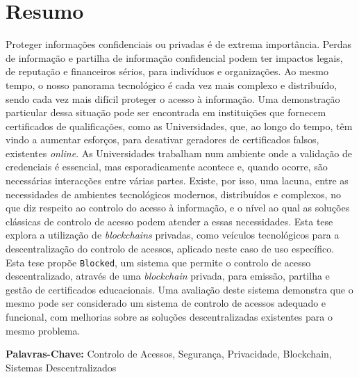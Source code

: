 \section*{Resumo}

Proteger informações confidenciais ou privadas é de extrema importância. Perdas de informação e partilha de informação confidencial podem ter impactos legais, de reputação e financeiros sérios, para indivíduos e organizações. Ao mesmo tempo, o nosso panorama tecnológico é cada vez mais complexo e distribuído, sendo cada vez mais difícil proteger o acesso à informação. Uma demonstração particular dessa situação pode ser encontrada em instituições que fornecem certificados de qualificações, como as Universidades, que, ao longo do tempo, têm vindo a aumentar esforços, para desativar geradores de certificados falsos, existentes \emph{online}. As Universidades trabalham num ambiente onde a validação de credenciais é essencial, mas esporadicamente acontece e, quando ocorre, são necessárias interacções entre várias partes. Existe, por isso, uma lacuna, entre as necessidades de ambientes tecnológicos modernos, distribuídos e complexos, no que diz respeito ao controlo do acesso à informação, e o nível ao qual as soluções clássicas de controlo de acesso podem atender a essas necessidades. Esta tese explora a utilização de \emph{blockchains} privadas, como veículos tecnológicos para a descentralização do controlo de acessos, aplicado neste caso de uso específico. Esta tese propõe \texttt{Blocked}, um sistema que permite o controlo de acesso descentralizado, através de uma \emph{blockchain} privada, para emissão, partilha e gestão de certificados educacionais. Uma avaliação deste sistema demonstra que o mesmo pode ser considerado um sistema de controlo de acessos adequado e funcional, com melhorias sobre as soluções descentralizadas existentes para o mesmo problema.

\vfill

\noindent \textbf{Palavras-Chave:} Controlo de Acessos, Segurança, Privacidade, Blockchain, Sistemas Descentralizados 